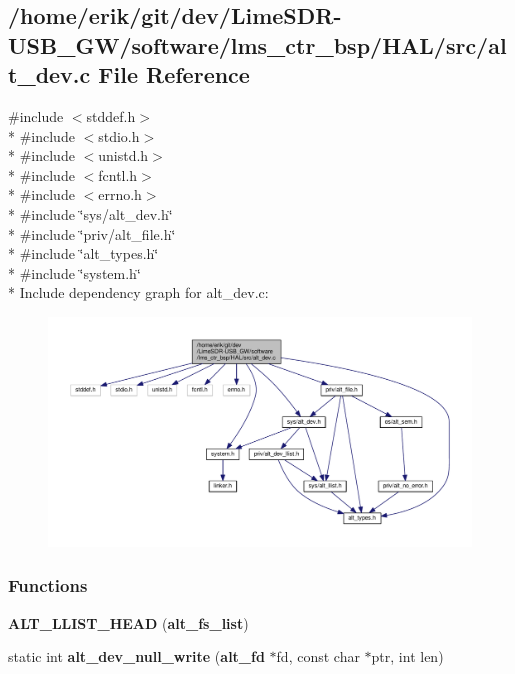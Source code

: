 \subsection{/home/erik/git/dev/\+Lime\+S\+D\+R-\/\+U\+S\+B\+\_\+\+G\+W/software/lms\+\_\+ctr\+\_\+bsp/\+H\+A\+L/src/alt\+\_\+dev.c File Reference}
\label{alt__dev_8c}
{\ttfamily \#include $<$stddef.\+h$>$}\\*
{\ttfamily \#include $<$stdio.\+h$>$}\\*
{\ttfamily \#include $<$unistd.\+h$>$}\\*
{\ttfamily \#include $<$fcntl.\+h$>$}\\*
{\ttfamily \#include $<$errno.\+h$>$}\\*
{\ttfamily \#include \char`\"{}sys/alt\+\_\+dev.\+h\char`\"{}}\\*
{\ttfamily \#include \char`\"{}priv/alt\+\_\+file.\+h\char`\"{}}\\*
{\ttfamily \#include \char`\"{}alt\+\_\+types.\+h\char`\"{}}\\*
{\ttfamily \#include \char`\"{}system.\+h\char`\"{}}\\*
Include dependency graph for alt\+\_\+dev.\+c\+:
\nopagebreak
\begin{figure}[H]
\begin{center}
\leavevmode
\includegraphics[width=350pt]{da/d82/alt__dev_8c__incl}
\end{center}
\end{figure}
\subsubsection*{Functions}
\begin{DoxyCompactItemize}
\item 
{\bf A\+L\+T\+\_\+\+L\+L\+I\+S\+T\+\_\+\+H\+E\+AD} ({\bf alt\+\_\+fs\+\_\+list})
\item 
static int {\bf alt\+\_\+dev\+\_\+null\+\_\+write} ({\bf alt\+\_\+fd} $\ast$fd, const char $\ast$ptr, int len)
\end{DoxyCompactItemize}
